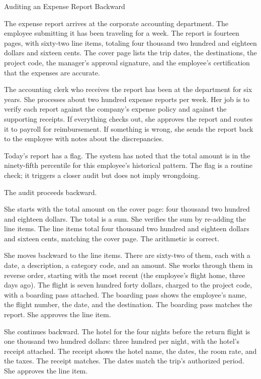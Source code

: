 \begin{coda}{Auditing an Expense Report Backward}

The expense report arrives at the corporate accounting department.
The employee submitting it has been traveling for a week. The report
is fourteen pages, with sixty-two line items, totaling four thousand
two hundred and eighteen dollars and sixteen cents. The cover page
lists the trip dates, the destinations, the project code, the
manager's approval signature, and the employee's certification that
the expenses are accurate.

The accounting clerk who receives the report has been at the
department for six years. She processes about two hundred expense
reports per week. Her job is to verify each report against the
company's expense policy and against the supporting receipts. If
everything checks out, she approves the report and routes it to
payroll for reimbursement. If something is wrong, she sends the
report back to the employee with notes about the discrepancies.

Today's report has a flag. The system has noted that the total
amount is in the ninety-fifth percentile for this employee's
historical pattern. The flag is a routine check; it triggers a
closer audit but does not imply wrongdoing.

The audit proceeds backward.

She starts with the total amount on the cover page: four thousand
two hundred and eighteen dollars. The total is a sum. She verifies
the sum by re-adding the line items. The line items total four
thousand two hundred and eighteen dollars and sixteen cents,
matching the cover page. The arithmetic is correct.

She moves backward to the line items. There are sixty-two of them,
each with a date, a description, a category code, and an amount.
She works through them in reverse order, starting with the most
recent (the employee's flight home, three days ago). The flight is
seven hundred forty dollars, charged to the project code, with a
boarding pass attached. The boarding pass shows the employee's
name, the flight number, the date, and the destination. The
boarding pass matches the report. She approves the line item.

She continues backward. The hotel for the four nights before the
return flight is one thousand two hundred dollars: three hundred
per night, with the hotel's receipt attached. The receipt shows
the hotel name, the dates, the room rate, and the taxes. The
receipt matches. The dates match the trip's authorized period.
She approves the line item.


\end{coda}
